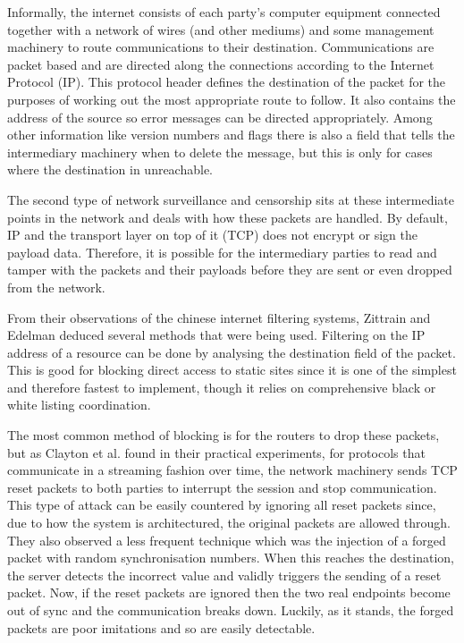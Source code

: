 \documentclass[10pt,a4paper]{article}
\begin{document}
Informally, the internet consists of each party's computer equipment connected together with a network of wires (and other mediums) and some management machinery to route communications to their destination.  Communications are packet based and are directed along the connections according to the Internet Protocol (IP)\cite{ip4}. This protocol header defines the destination of the packet for the purposes of working out the most appropriate route to follow. It also contains the address of the source so error messages can be directed appropriately. Among other information like version numbers and flags there is also a field that tells the intermediary machinery when to delete the message, but this is only for cases where the destination in unreachable. 

The second type of network surveillance and censorship sits at these intermediate points in the network and deals with how these packets are handled. By default, IP and the transport layer on top of it (TCP) does not encrypt or sign the payload data. Therefore, it is possible for the intermediary parties to read and tamper with the packets and their payloads before they are sent or even dropped from the network. 

From their observations of the chinese internet filtering systems, Zittrain and Edelman\cite{edelman2005empirical} deduced several methods that were being used. Filtering on the IP address of a resource can be done by analysing the destination field of the packet. This is good for blocking direct access to static sites since it  is one of the simplest and therefore fastest to implement, though it relies on comprehensive black or white listing coordination.

The most common method of blocking is for the routers to drop these packets, but as Clayton et al. found in their practical experiments\cite{clayton2006ignoring}, for protocols that communicate in a streaming fashion over time, the network machinery sends TCP reset packets to both parties to interrupt the session and stop communication. This type of attack can be easily countered by ignoring all reset packets since, due to how the system is architectured, the original packets are allowed through. They also observed a less frequent technique which was the injection of a forged packet with random synchronisation numbers. When this reaches the destination, the server detects the incorrect value and validly triggers the sending of a reset packet. Now, if the reset packets are ignored then the two real endpoints become out of sync and the communication breaks down. Luckily, as it stands, the forged packets are poor imitations and so are easily detectable.
\end{document}
